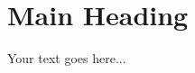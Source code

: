 \documentclass{article}
\begin{document}
\section{Main Heading}

Your text goes here...

%
%
\end{document}
